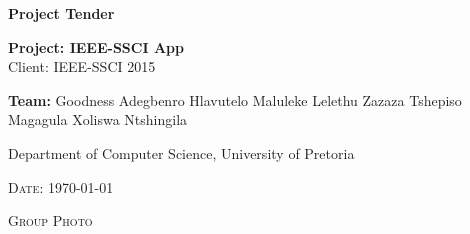 \begin{titlepage}
	\begin{center}
		
		\textbf{\huge Project Tender } \\
		\vfill

		\textbf{\large Project: IEEE-SSCI App} \\
		{\large Client: IEEE-SSCI 2015 } \\ 
		
		
		\begin{flushright} \large
			\textbf{Team:}\newline
			Goodness Adegbenro\newline
			Hlavutelo Maluleke\newline
			Lelethu Zazaza\newline
			Tshepiso Magagula\newline
			Xoliswa Ntshingila\newline
		\end{flushright}
		{\large Department of Computer Science, University of Pretoria } \\ 
		
	

		\vfill

		

		\textsc{\large Date: \today}	

		\vfill
	
		\textsc{\large Group Photo } \\ 	
		
		
	\end{center}
\end{titlepage}
